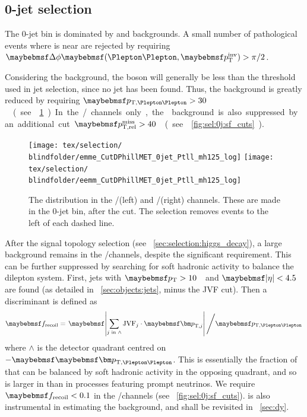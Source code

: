 \subsection{0-jet selection}
\label{sec:selection:0j}

The 0-jet bin is dominated by \DY and \WW backgrounds. A small number of pathological 
events where \corrtrackmetvec is near \ptllvec are rejected by requiring $\dphillmet > \pi/2$.

Considering the \DYll background, the boson \pt will generally be less than the \pt 
threshold used in jet selection, since no jet has been found. Thus, the \DY background is 
greatly reduced by requiring \unit{$\ptll > 30$}{\GeV} (see 
\Figure~\ref{fig:sel:0j:ptll}). In the \eech/\mmch channels only, the \DYll background is 
also suppressed by an additional cut \unit{$\trackmetrel > 40$}{\GeV} (see 
\Figure~\ref{fig:sel:0j:sf_cuts}).

\begin{figure}[t]
	\texttt{[image: tex/selection/\\blindfolder/emme\_CutDPhillMET\_0jet\_Ptll\_mh125\_log]}
	\hfill
	\texttt{[image: tex/selection/\\blindfolder/eemm\_CutDPhillMET\_0jet\_Ptll\_mh125\_log]}
	\caption{The \ptll distribution in the \emch/\mech (left) and \eech/\mmch (right) 
	channels. These are made in the 0-jet bin, after the \dphillmet cut. The selection 
	removes events to the left of each dashed line.}
	\label{fig:sel:0j:ptll}
\end{figure}

After the signal topology selection (see \Section~\ref{sec:selection:higgs_decay}), a 
large \DYll background remains in the \eech/\mmch channels, despite the significant \met 
requirement. This can be further suppressed by searching for soft hadronic activity to 
balance the dilepton system. First, jets with \unit{$\pt > 10$}{\GeV} and $\mods{\eta} < 
4.5$ are found (as detailed in \Section~\ref{sec:objects:jets}, minus the JVF cut). 
Then a discriminant is defined as
\begin{equation}
	\frecoil = \left. \mods{\sum\limits_{j\text{ in }\wedge} \text{JVF}_{j} \cdot \bvec{p}_{\text{T,}j}} \, \middle/ \ptll \right.
	\label{eq:frecoil}
\end{equation}
where $\wedge$ is the detector quadrant centred on $-\ptllvec$. This is essentially the 
fraction of \ptll that can be balanced by soft hadronic activity in the opposing quadrant,
and so is larger in \DYll than in processes featuring prompt neutrinos. We require 
$\frecoil < 0.1$ in the \eech/\mmch channels (see \Figure~\ref{fig:sel:0j:sf_cuts}). 
\frecoil is also instrumental in estimating the \DYll background, and shall be revisited in 
\Section~\ref{sec:dy}.

